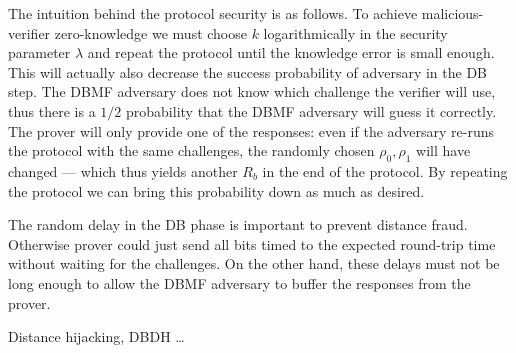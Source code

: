 The intuition behind the protocol security is as follows.
To achieve malicious-verifier zero-knowledge we must choose \(k\) 
logarithmically in the security parameter \(\lambda\) and repeat the protocol 
until the knowledge error is small enough.
This will actually also decrease the success probability of  adversary 
in the \ac{DB} step.
The \ac{DBMF} adversary does not know which challenge the verifier will use, 
thus there is a \(1/2\) probability that the \ac{DBMF} adversary will guess it 
correctly.
The prover will only provide one of the responses: even if the adversary re-runs 
the protocol with the same challenges, the randomly chosen \(\rho_0, \rho_1\) 
will have changed --- which thus yields another \(R_b\) in the end of the 
protocol.
By repeating the protocol we can bring this probability down as much as desired.

The random delay in the \ac{DB} phase is important to prevent distance fraud.
Otherwise  prover could just send all bits timed to the expected 
round-trip time without waiting for the challenges.
On the other hand, these delays must not be long enough to allow the \ac{DBMF} 
adversary to buffer the responses from the prover.

Distance hijacking, \ac{DBDH} \dots
